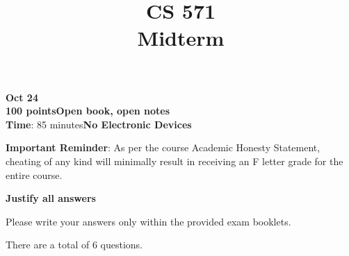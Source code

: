 \documentclass[12pt]{article}
\title{CS 571\\Midterm}
\date{}
\begin{document}
\maketitle

\begin{flushleft}
\textbf{Oct 24}\\
\textbf{100 points}\hfill\textbf{Open book, open notes}\\
\textbf{Time}: 85 minutes\hfill\textbf{No Electronic Devices}\\

\vspace{0.5cm}

\textbf{Important Reminder}: As per the course Academic Honesty
Statement, cheating of any kind will minimally result in receiving an
F letter grade for the entire course.

\textbf{Justify all answers}

Please write your answers only within the provided exam booklets.

\end{flushleft}

There are a total of 6 questions.
\end{document}
